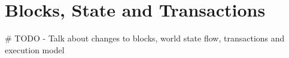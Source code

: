 \section{Blocks, State and Transactions}

\# TODO - Talk about changes to blocks, world state flow, transactions and execution model
  
